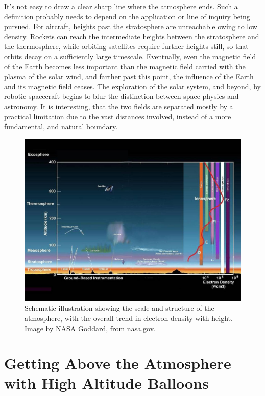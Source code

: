 It's not easy to draw a clear sharp line where the atmosphere ends. Such a definition probably needs to depend on the application or line of inquiry being pursued. For aircraft, heights past the stratosphere are unreachable owing to low density. Rockets can reach the intermediate heights between the stratosphere and the thermosphere, while orbiting satellites require further heights still, so that orbits decay on a sufficiently large timescale. Eventually, even the magnetic field of the Earth becomes less important than the magnetic field carried with the plasma of the solar wind, and farther past this point, the influence of the Earth and its magnetic field ceases. The exploration of the solar system, and beyond, by robotic spacecraft begins to  blur the distinction between space physics and astronomy. It is interesting, that the two fields are separated mostly by a practical limitation due to the vast distances involved, instead of a more fundamental, and natural boundary.


\begin{figure}[p]
\label{}
\begin{centering}
\includegraphics[width=.9\textwidth]{figures/chapter_1/atmosphere_schematic/atmosphere_schematic}
\caption{Schematic illustration showing the scale and structure of the atmosphere, with the overall trend in electron density with height. Image by NASA Goddard, from nasa.gov.}
\end{centering}
\end{figure}
\newpage

\section{Getting Above the Atmosphere with High Altitude Balloons}


